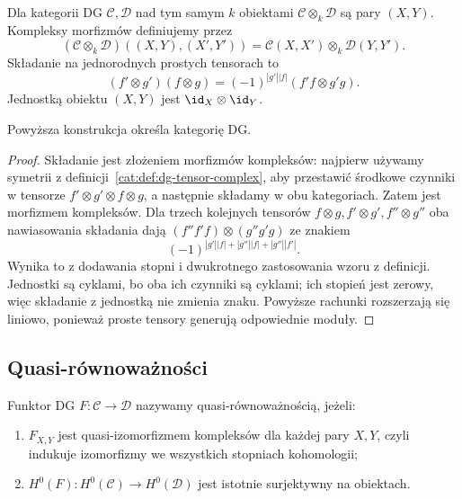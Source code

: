 \begin{definicja}\label{cat:def:dg-category-tensor}
Dla kategorii DG $\mathcal C,\mathcal D$ nad tym samym $k$ obiektami $\mathcal C\otimes_k\mathcal D$ są pary $(X,Y)$. Kompleksy morfizmów definiujemy przez
\[
 (\mathcal C\otimes_k\mathcal D)((X,Y),(X',Y'))
 =\mathcal C(X,X')\otimes_k\mathcal D(Y,Y').
\]
Składanie na jednorodnych prostych tensorach to
\[
 (f'\otimes g')(f\otimes g)
 =(-1)^{|g'||f|}(f'f\otimes g'g).
\]
Jednostką obiektu $(X,Y)$ jest $\id_X\otimes\id_Y$.
\end{definicja}

\begin{stwierdzenie}\label{cat:prop:dg-category-tensor}
Powyższa konstrukcja określa kategorię DG.
\end{stwierdzenie}
\begin{proof}
Składanie jest złożeniem morfizmów kompleksów: najpierw używamy symetrii z definicji~\ref{cat:def:dg-tensor-complex}, aby przestawić środkowe czynniki w tensorze $f'\otimes g'\otimes f\otimes g$, a następnie składamy w obu kategoriach. Zatem jest morfizmem kompleksów. Dla trzech kolejnych tensorów $f\otimes g,f'\otimes g',f''\otimes g''$ oba nawiasowania składania dają $(f''f'f)\otimes(g''g'g)$ ze znakiem
\[
 (-1)^{|g'||f|+|g''||f|+|g''||f'|}.
\]
Wynika to z dodawania stopni i dwukrotnego zastosowania wzoru z definicji. Jednostki są cyklami, bo oba ich czynniki są cyklami; ich stopień jest zerowy, więc składanie z jednostką nie zmienia znaku. Powyższe rachunki rozszerzają się liniowo, ponieważ proste tensory generują odpowiednie moduły.
\end{proof}

\subsection{Quasi-równoważności}

\begin{definicja}\label{cat:def:dg-quasi-equivalence}
Funktor DG $F:\mathcal C\to\mathcal D$ nazywamy quasi-równoważnością, jeżeli:
\begin{enumerate}
 \item $F_{X,Y}$ jest quasi-izomorfizmem kompleksów dla każdej pary $X,Y$, czyli indukuje izomorfizmy we wszystkich stopniach kohomologii;
 \item $H^0(F):H^0(\mathcal C)\to H^0(\mathcal D)$ jest istotnie surjektywny na obiektach.
\end{enumerate}
\end{definicja}

